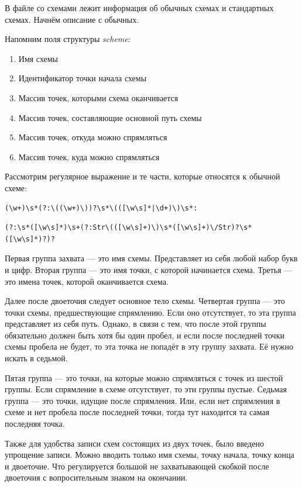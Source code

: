 \documentclass[12pt, a4 paper]{article}
\theoremstyle{plain}
\begin{document}
В файле со схемами лежит информация об обычных схемах и стандартных схемах. Начнём описание с обычных.

Напомним поля структуры \textit{scheme}:
\begin{enumerate}
	\item Имя схемы
	\item Идентификатор точки начала схемы
	\item Массив точек, которыми схема оканчивается
	\item Массив точек, составляющие основной путь схемы
	\item Массив точек, откуда можно спрямляться
	\item Массив точек, куда можно спрямляться
\end{enumerate}

Рассмотрим регулярное выражение и те части, которые относятся к обычной схеме:

\begin{verbatim}
(\w+)\s*(?:\((\w+)\))?\s*\(([\w\s]*|\d+)\)\s*:
\end{verbatim}

\begin{verbatim}
(?:\s*([\w\s]*)\s+(?:Str\(([\w\s]+)\)\s*([\w\s]+)\/Str)?\s*([\w\s]*)?)?
\end{verbatim}

Первая группа захвата --- это имя схемы. Представляет из себя любой набор букв и цифр.
Вторая группа --- это имя точки, с которой начинается схема.
Третья --- это имена точек, которой оканчивается схема.

Далее после двоеточия следует основное тело схемы. Четвертая группа — это точки схемы, предшествующие спрямлению. Если оно отсутствует, то эта группа представляет из себя путь. Однако, в связи с тем, что после этой группы обязательно должен быть хотя бы один пробел, и если после последней точки схемы пробела не будет, то эта точка не попадёт в эту группу захвата. Её нужно искать в седьмой.

Пятая группа --- это точки, на которые можно спрямляться с точек из шестой группы. Если спрямление в схеме отсутствует, то эти группы пустые. 
Седьмая группа --- это точки, идущие после спрямления. Или, если нет спрямления в схеме и нет пробела после последней точки, тогда тут находится та самая последняя точка.

Также для удобства записи схем состоящих из двух точек, было введено упрощение записи. Можно вводить только имя схемы, точку начала, точку конца и двоеточие. Что регулируется большой не захватывающей скобкой после двоеточия с вопросительным знаком на окончании.
\end{document}
